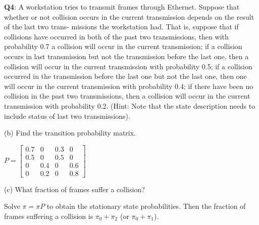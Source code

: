 \documentclass{scrartcl}
\begin{document}
\begin{multicols*}{3}
{\bf Q4}: A workstation tries to transmit frames through Ethernet. Suppose that whether or not collision occurs in the current transmission depends on the result of the last two trans- missions the workstation had. That is, suppose that if collisions have occurred in both of the past two transmissions, then with probability 0.7 a collision will occur in the current transmission; if a collision occurs in last transmission but not the transmission before the last one, then a collision will occur in the current transmission with probability 0.5; if a collision occurred in the transmission before the last one but not the last one, then one will occur in the current transmission with probability 0.4; if there have been no collision in the past two transmissions, then a collision will occur in the current transmission with probability 0.2. (Hint: Note that the state description needs to include status of last two transmissions).

(b) Find the transition probability matrix.

$P=\begin{bmatrix}0.7 & 0 & 0.3 & 0 \\ 0.5 & 0 & 0.5 & 0 \\ 0 & 0.4 & 0 & 0.6 \\ 0 & 0.2 & 0 & 0.8\end{bmatrix}$

(c) What fraction of frames suffer a collision?

Solve $\pi = \pi P$ to obtain the stationary state probabilities. Then the fraction of frames suffering a collision is $\pi_0 + \pi_2$ (or $\pi_0 + \pi_1$).

\end{multicols*}
\end{document}
